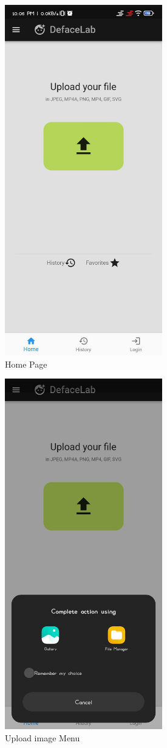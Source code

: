 \begin{figure}[ht]
    \centering
    \includegraphics[height =6in ]{img/homepage.jpg}
    \caption{Home Page}
\end{figure}

\begin{figure}[ht]
    \centering
    \includegraphics[height =6in ]{img/uploader.jpg}
    \caption{Upload image Menu}
\end{figure}